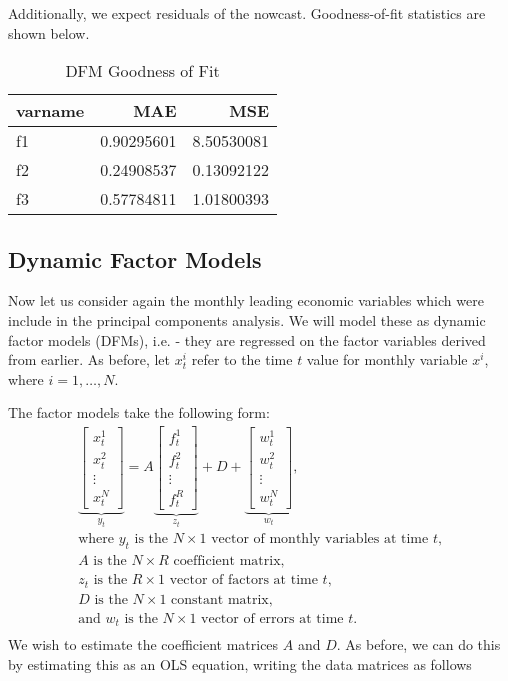 \documentclass[11pt, letterpaper]{article}\usepackage[]{graphicx}\usepackage[]{color}
\begin{document}
Additionally, we expect residuals of the nowcast. Goodness-of-fit statistics are shown below.
\begin{table}[H]
\centering
\begingroup\footnotesize
\begin{tabular}{lrr}
  \hline
varname & MAE & MSE \\ 
  \hline
f1 & 0.90295601 & 8.50530081 \\ 
  f2 & 0.24908537 & 0.13092122 \\ 
  f3 & 0.57784811 & 1.01800393 \\ 
   \hline
\end{tabular}
\endgroup
\caption{DFM Goodness of Fit} 
\end{table}




\subsection{Dynamic Factor Models}
Now let us consider again the monthly leading economic variables which were include in the principal components analysis. We will model these as dynamic factor models (DFMs), i.e. - they are regressed on the factor variables derived from earlier. As before, let $x^i_t$ refer to the time $t$ value for monthly variable $x^i$, where $i = 1, \dots, N$.

The factor models take the following form:
\begin{align*}
\underbrace{\begin{bmatrix}
	x^1_t\\
	x^2_t\\
	\vdots \\
	x^N_t
\end{bmatrix}}_{y_t}
=
A
\underbrace{\begin{bmatrix}
	f^1_{t}\\
	f^2_{t}\\
	\vdots \\
	f^R_{t}
\end{bmatrix}}_{z_t}
+
D 
+
\underbrace{\begin{bmatrix}
	w^1_t\\
	w^2_t\\
	\vdots\\
	w^N_t
\end{bmatrix}}_{w_t},\\
\text{where $y_t$ is the $N \times 1$ vector of monthly variables at time $t$,}\\
\text{$A$ is the $N \times R$ coefficient matrix,}\\
\text{$z_t$ is the $R \times 1$ vector of factors at time $t$,}\\
\text{$D$ is the $N \times 1$ constant matrix,}\\
\text{and $w_t$ is the $N \times 1$ vector of errors at time $t$.}\\
\end{align*}
We wish to estimate the coefficient matrices $A$ and $D$. As before, we can do this by estimating this as an OLS equation, writing the data matrices as follows
\end{document}
